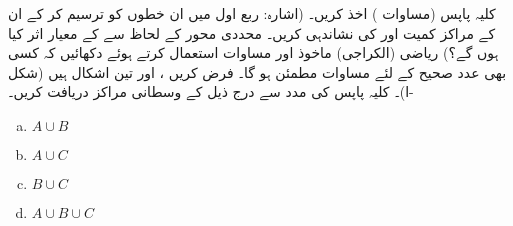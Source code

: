 کلیہ پاپس (مساوات )  اخذ کریں۔ (اشارہ:  ربع اول میں ان خطوں کو ترسیم کر کے ان کے  مراکز کمیت   اور  کی نشاندہی کریں۔  محددی محور کے لحاظ سے  کے معیار اثر کیا ہوں گے؟)
ریاضی (الکراجی)  ماخوذ اور مساوات  استعمال کرتے ہوئے دکھائیں کہ کسی بھی عدد صحیح  کے لئے  مساوات  مطمئن ہو گا۔
فرض کریں  ،  اور  تین اشکال ہیں (شکل -ا)۔ کلیہ پاپس کی مدد سے  درج ذیل کے وسطانی مراکز دریافت کریں۔
\begin{multicols}{4}
\begin{enumerate}[a.]
\item
$A\cup B$
\item
$A\cup C$
\item
$B\cup C$
\item
$A\cup B\cup C$
\end{enumerate}
\end{multicols}
